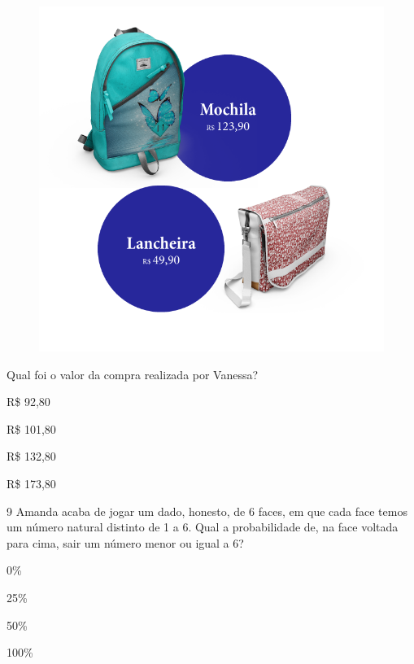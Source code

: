 \begin{figure}[htpb!]
\includegraphics[width=\textwidth]{../ilustracoes/MAT5/SAEB_5ANO_MAT_figura119.png}
\end{figure}

Qual foi o valor da compra realizada por Vanessa?

\begin{escolha}
\item
  R\$ 92,80
\item
  R\$ 101,80
\item
  R\$ 132,80
\item
  R\$ 173,80
\end{escolha}


\num{9} Amanda acaba de jogar um dado, honesto, de 6 faces, em que cada
face temos um número natural distinto de 1 a 6. Qual a probabilidade de,
na face voltada para cima, sair um número menor ou igual a 6?

\begin{escolha}
\item
  0\%
\item
  25\%
\item
  50\%
\item
  100\%
\end{escolha}

